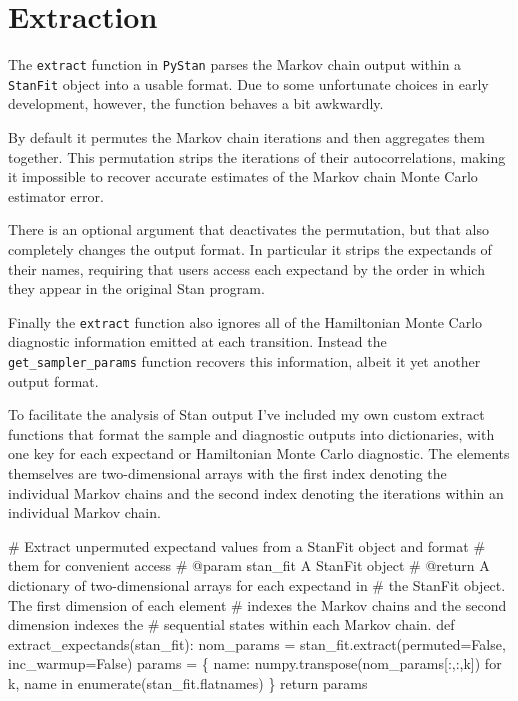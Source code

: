 \documentclass[
  letterpaper,
  DIV=11,
  numbers=noendperiod]{scrartcl}
\newenvironment{Shaded}{\begin{snugshade}}{\end{snugshade}}
\newcommand{\BuiltInTok}[1]{\textcolor[rgb]{0.00,0.23,0.31}{#1}}
\newcommand{\CommentTok}[1]{\textcolor[rgb]{0.37,0.37,0.37}{#1}}
\newcommand{\ControlFlowTok}[1]{\textcolor[rgb]{0.00,0.23,0.31}{#1}}
\newcommand{\KeywordTok}[1]{\textcolor[rgb]{0.00,0.23,0.31}{#1}}
\newcommand{\NormalTok}[1]{\textcolor[rgb]{0.00,0.23,0.31}{#1}}
\newcommand{\OperatorTok}[1]{\textcolor[rgb]{0.37,0.37,0.37}{#1}}
\newcommand{\VariableTok}[1]{\textcolor[rgb]{0.07,0.07,0.07}{#1}}
\begin{document}
\section{Extraction}\label{extraction}

The \texttt{extract} function in \texttt{PyStan} parses the Markov chain
output within a \texttt{StanFit} object into a usable format. Due to
some unfortunate choices in early development, however, the function
behaves a bit awkwardly.

By default it permutes the Markov chain iterations and then aggregates
them together. This permutation strips the iterations of their
autocorrelations, making it impossible to recover accurate estimates of
the Markov chain Monte Carlo estimator error.

There is an optional argument that deactivates the permutation, but that
also completely changes the output format. In particular it strips the
expectands of their names, requiring that users access each expectand by
the order in which they appear in the original Stan program.

Finally the \texttt{extract} function also ignores all of the
Hamiltonian Monte Carlo diagnostic information emitted at each
transition. Instead the \texttt{get\_sampler\_params} function recovers
this information, albeit it yet another output format.

To facilitate the analysis of Stan output I've included my own custom
extract functions that format the sample and diagnostic outputs into
dictionaries, with one key for each expectand or Hamiltonian Monte Carlo
diagnostic. The elements themselves are two-dimensional arrays with the
first index denoting the individual Markov chains and the second index
denoting the iterations within an individual Markov chain.

\begin{Shaded}
\begin{Highlighting}[]
\CommentTok{\# Extract unpermuted expectand values from a StanFit object and format }
\CommentTok{\# them for convenient access}
\CommentTok{\# @param stan\_fit A StanFit object}
\CommentTok{\# @return A dictionary of two{-}dimensional arrays for each expectand in }
\CommentTok{\#         the StanFit object.  The first dimension of each element }
\CommentTok{\#         indexes the Markov chains and the second dimension indexes the }
\CommentTok{\#         sequential states within each Markov chain. }
\KeywordTok{def}\NormalTok{ extract\_expectands(stan\_fit):}
\NormalTok{  nom\_params }\OperatorTok{=}\NormalTok{ stan\_fit.extract(permuted}\OperatorTok{=}\VariableTok{False}\NormalTok{, inc\_warmup}\OperatorTok{=}\VariableTok{False}\NormalTok{)}
\NormalTok{  params }\OperatorTok{=}\NormalTok{ \{ name: numpy.transpose(nom\_params[:,:,k]) }
             \ControlFlowTok{for}\NormalTok{ k, name }\KeywordTok{in} \BuiltInTok{enumerate}\NormalTok{(stan\_fit.flatnames) \}}
  \ControlFlowTok{return}\NormalTok{ params}
\end{Highlighting}
\end{Shaded}
\end{document}
